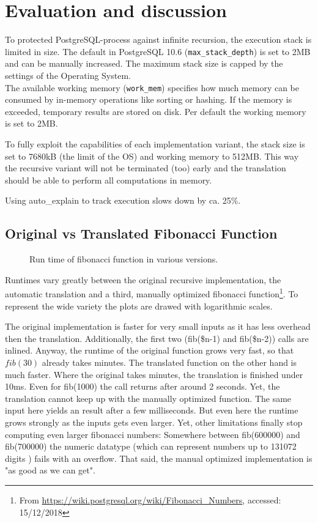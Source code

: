 \chapter{Evaluation and discussion}\label{results_discussion}

To protected PostgreSQL-process against infinite recursion, the execution stack is limited in size. The default in PostgreSQL 10.6 (\texttt{max\_stack\_depth}) is set to 2MB and can be manually increased. The maximum stack size is capped by the settings of the Operating System.\\
The available working memory (\texttt{work\_mem}) specifies how much memory can be consumed by in-memory operations like sorting or hashing. If the memory is exceeded, temporary results are stored on disk. Per default the working memory is set to 2MB. \cite[p. 512 ff.]{psql}

To fully exploit the capabilities of each implementation variant, the stack size is set to 7680kB (the limit of the OS) and working memory to 512MB. This way the recursive variant will not be terminated (too) early and the translation should be able to perform all computations in memory.

Using auto\_explain to track execution slows down by ca. 25\%.


\section{Original vs Translated Fibonacci Function}

\begin{figure}[h]
    \centering
    
    \caption{Run time of fibonacci function in various versions.}
    \label{fig:fib_times}
\end{figure}
Runtimes vary greatly between the original recursive implementation, the automatic translation and a third, manually optimized fibonacci function\footnote{From \url{https://wiki.postgresql.org/wiki/Fibonacci_Numbers}, accessed: 15/12/2018}. To represent the wide variety the plots are drawed with logarithmic scales.

The original implementation is faster for very small inputs as it has less overhead then the translation. Additionally, the first two (fib(\$n-1) and fib(\$n-2)) calls are inlined. Anyway, the runtime of the original function grows very fast, so that $fib(30)$ already takes minutes. The translated function on the other hand is much faster. Where the original takes minutes, the translation is finished under 10ms. Even for fib(1000) the call returns after around 2 seconds. Yet, the translation cannot keep up with the manually optimized function. The same input here yields an result after a few milliseconds. But even here the runtime grows strongly as the inputs gets even larger. Yet, other limitations finally stop computing even larger fibonacci numbers: Somewhere between fib(600000) and fib(700000) the numeric datatype (which can represent numbers up to 131072 digits \cite[p. 124 f.]{psql}) fails with an overflow. That said, the manual optimized implementation is "as good as we can get".


